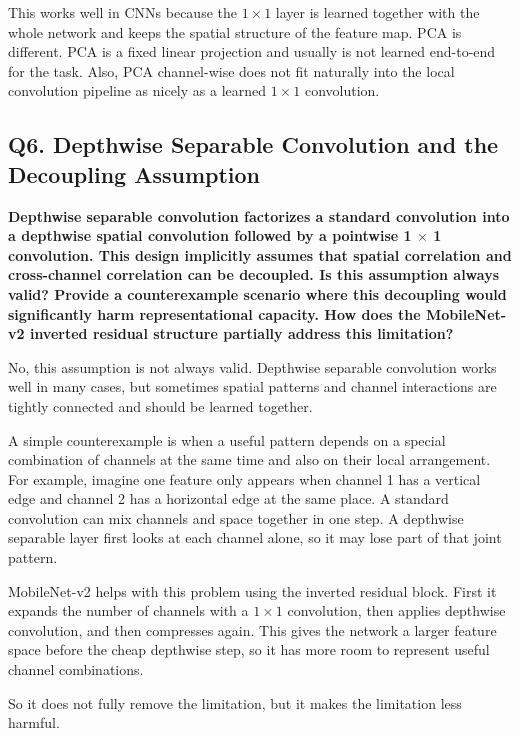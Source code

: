 \documentclass[12pt,a4paper]{article}
\newcommand{\qtext}[1]{\noindent\textbf{#1}\par}
\newcommand{\ansstart}{\begingroup\color{answerblue}}
\newcommand{\ansend}{\endgroup}
\begin{document}
This works well in CNNs because the \(1 \times 1\) layer is learned together with the whole network and keeps the spatial structure of the feature map. PCA is different. PCA is a fixed linear projection and usually is not learned end-to-end for the task. Also, PCA channel-wise does not fit naturally into the local convolution pipeline as nicely as a learned \(1 \times 1\) convolution.
\ansend

\clearpage

\subsection{Q6. Depthwise Separable Convolution and the Decoupling Assumption}

\qtext{Depthwise separable convolution factorizes a standard convolution into a depthwise spatial convolution followed by a pointwise 1 \(\times\) 1 convolution. This design implicitly assumes that spatial correlation and cross-channel correlation can be decoupled. Is this assumption always valid? Provide a counterexample scenario where this decoupling would significantly harm representational capacity. How does the MobileNet-v2 inverted residual structure partially address this limitation?}

\ansstart
No, this assumption is not always valid. Depthwise separable convolution works well in many cases, but sometimes spatial patterns and channel interactions are tightly connected and should be learned together.

A simple counterexample is when a useful pattern depends on a special combination of channels at the same time and also on their local arrangement. For example, imagine one feature only appears when channel 1 has a vertical edge and channel 2 has a horizontal edge at the same place. A standard convolution can mix channels and space together in one step. A depthwise separable layer first looks at each channel alone, so it may lose part of that joint pattern.

MobileNet-v2 helps with this problem using the inverted residual block. First it expands the number of channels with a \(1 \times 1\) convolution, then applies depthwise convolution, and then compresses again. This gives the network a larger feature space before the cheap depthwise step, so it has more room to represent useful channel combinations.

So it does not fully remove the limitation, but it makes the limitation less harmful.
\ansend

\clearpage
\end{document}
